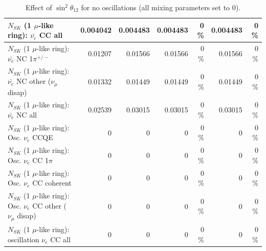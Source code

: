 \begin{table}
\begin{tabular}{| l | r | r | r  r | r  r |}
                            $N_{SK}$ (1 $\mu$-like ring): $\bar{\nu_{e}}$ CC all &        0.004042 &        0.004483 &        0.004483 &        0 \%  &        0.004483 &        0 \%  \\ 
\hline
                     $N_{SK}$ (1 $\mu$-like ring): $\bar{\nu_e}$ NC 1$\pi^{+/-}$ &         0.01207 &         0.01566 &         0.01566 &        0 \%  &         0.01566 &        0 \%  \\ 
          $N_{SK}$ (1 $\mu$-like ring): $\bar{\nu_e}$ NC other ($\nu_\mu$ disap) &         0.01332 &         0.01449 &         0.01449 &        0 \%  &         0.01449 &        0 \%  \\ 
                            $N_{SK}$ (1 $\mu$-like ring): $\bar{\nu_{e}}$ NC all &         0.02539 &         0.03015 &         0.03015 &        0 \%  &         0.03015 &        0 \%  \\ 
\hline
\hline
\hline
                                 $N_{SK}$ (1 $\mu$-like ring): Osc. $\nu_e$ CCQE &               0 &               0 &               0 &        0 \%  &               0 &        0 \%  \\ 
                            $N_{SK}$ (1 $\mu$-like ring): Osc. $\nu_e$ CC 1$\pi$ &               0 &               0 &               0 &        0 \%  &               0 &        0 \%  \\ 
                          $N_{SK}$ (1 $\mu$-like ring): Osc. $\nu_e$ CC coherent &               0 &               0 &               0 &        0 \%  &               0 &        0 \%  \\ 
           $N_{SK}$ (1 $\mu$-like ring): Osc. $\nu_e$ CC other ($\nu_\mu$ disap) &               0 &               0 &               0 &        0 \%  &               0 &        0 \%  \\ 
                        $N_{SK}$ (1 $\mu$-like ring): oscillation $\nu_e$ CC all &               0 &               0 &               0 &        0 \%  &               0 &        0 \%  \\ 
\hline
\hline
\end{tabular}
\caption{ Effect of $\sin^2\theta_{12}$ for no oscillations (all mixing parameters set to 0). }
\label{tab:num_mixing12_1RmuT_3f_osc_t13:0}
\end{table}
\clearpage
